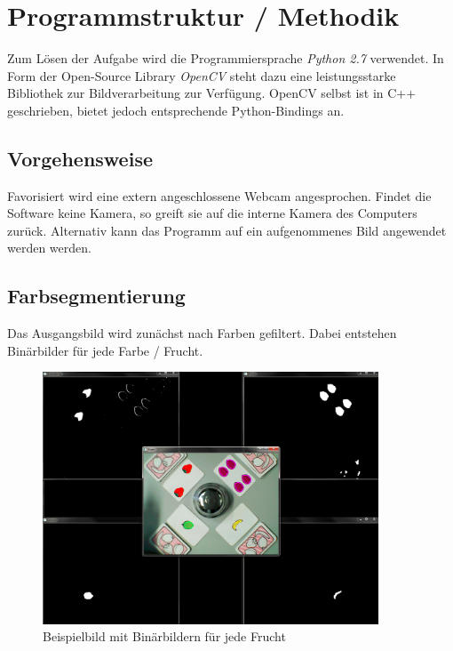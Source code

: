 
\section{Programmstruktur / Methodik}
\label{sec:Programmstruktur}

Zum Lösen der Aufgabe wird die Programmiersprache \emph{Python 2.7} verwendet. In Form der Open-Source Library \emph{OpenCV} steht dazu eine leistungsstarke Bibliothek zur Bildverarbeitung zur Verfügung.
OpenCV selbst ist in C++ geschrieben, bietet jedoch entsprechende Python-Bindings an.


\subsection{Vorgehensweise}

Favorisiert wird eine extern angeschlossene Webcam angesprochen. Findet die Software keine Kamera, so greift sie auf die interne Kamera des Computers zurück. Alternativ kann das Programm auf ein aufgenommenes Bild angewendet werden werden. %

\subsection{Farbsegmentierung}

Das Ausgangsbild wird zunächst nach Farben gefiltert. Dabei entstehen Binärbilder für jede Farbe / Frucht. 

\begin{figure}[h]
    \centering
    \includegraphics[width=10cm]{Abbildungen/Binaerbild01}
    \caption[Binär01]{Beispielbild mit Binärbildern für jede Frucht}
    \label{fig:Binär01}
\end{figure}

